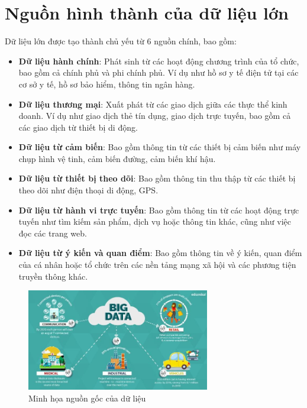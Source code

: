 \documentclass{report}
\begin{document}
\section{Nguồn hình thành của dữ liệu lớn}
Dữ liệu lớn được tạo thành chủ yếu từ 6 nguồn chính, bao gồm:
\begin{itemize}
    \item \textbf{Dữ liệu hành chính}: Phát sinh từ các hoạt động chương trình của tổ chức,
          bao gồm cả chính phủ và phi chính phủ. Ví dụ như hồ sơ y tế điện tử tại các
          cơ sở y tế, hồ sơ bảo hiểm, thông tin ngân hàng.
    \item \textbf{Dữ liệu thương mại}: Xuất phát từ các giao dịch giữa các thực thể kinh
          doanh. Ví dụ như giao dịch thẻ tín dụng, giao dịch trực tuyến, bao gồm cả các
          giao dịch từ thiết bị di động.
    \item \textbf{Dữ liệu từ cảm biến}: Bao gồm thông tin từ các thiết bị cảm biến như
          máy chụp hình vệ tinh, cảm biến đường, cảm biến khí hậu.
    \item \textbf{Dữ liệu từ thiết bị theo dõi}: Bao gồm thông tin thu thập từ các thiết bị
          theo dõi như điện thoại di động, GPS.
    \item \textbf{Dữ liệu từ hành vi trực tuyến}: Bao gồm thông tin từ các hoạt động trực
          tuyến như tìm kiếm sản phẩm, dịch vụ hoặc thông tin khác, cũng như việc đọc
          các trang web.
    \item \textbf{Dữ liệu từ ý kiến và quan điểm}: Bao gồm thông tin về ý kiến, quan điểm
          của cá nhân hoặc tổ chức trên các nền tảng mạng xã hội và các phương tiện
          truyền thông khác.
\end{itemize}
\begin{figure}[h]
    \centering
    \includegraphics[width=8cm]{images/BigData.jpg}
    \caption{Minh họa nguồn gốc của dữ liệu}
\end{figure}

\end{document}
